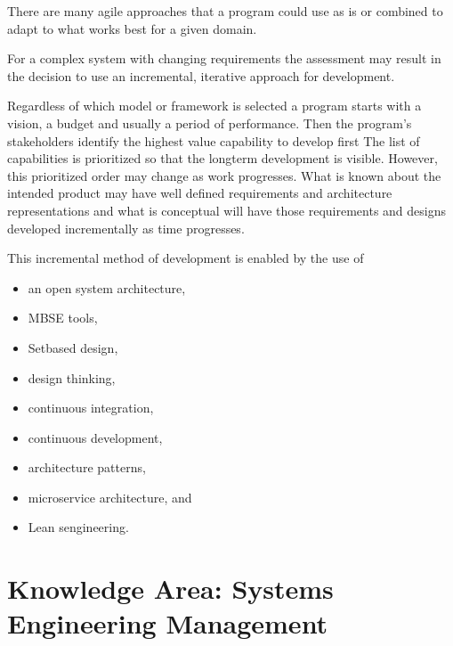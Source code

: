 \documentclass[letterpaper,10pt,english]{jupyterBook}
\begin{document}
\sphinxAtStartPar
There are many agile approaches that a program could use as is or combined to adapt to what works best for a given domain.

\sphinxAtStartPar
For a complex system with changing requirements the assessment may result in the decision to use an incremental,
iterative approach for development.

\sphinxAtStartPar
Regardless of which model or framework is selected a program starts with a vision, a budget and usually a period of performance. Then the program’s stakeholders identify the highest value capability to develop first
The list of capabilities is prioritized so that the long\sphinxhyphen{}term development is visible.
However, this prioritized order may change as work progresses.
What is known about the intended product may have well defined requirements and architecture representations and what is conceptual will have those requirements and designs developed incrementally as time progresses.

\sphinxAtStartPar
This incremental method of development is enabled by the use of
\begin{itemize}
\item {} 
\sphinxAtStartPar
an open system architecture,

\item {} 
\sphinxAtStartPar
MBSE tools,

\item {} 
\sphinxAtStartPar
Set\sphinxhyphen{}based design,

\item {} 
\sphinxAtStartPar
design thinking,

\item {} 
\sphinxAtStartPar
continuous integration,

\item {} 
\sphinxAtStartPar
continuous development,

\item {} 
\sphinxAtStartPar
architecture patterns,

\item {} 
\sphinxAtStartPar
microservice architecture, and

\item {} 
\sphinxAtStartPar
Lean sengineering.

\end{itemize}


\section{Knowledge Area: Systems Engineering Management}
\label{\detokenize{SE/sebok:knowledge-area-systems-engineering-management}}
\end{document}
